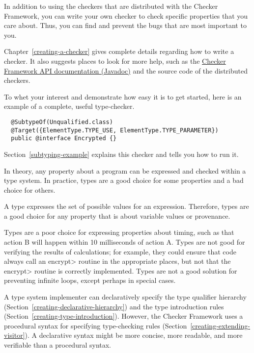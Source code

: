 

In addition to using the checkers that are distributed with the Checker
Framework, you can write your own checker to check specific properties that
you care about.  Thus, you can find and prevent the bugs that are most
important to you.

Chapter~\ref{creating-a-checker} gives
complete details regarding how to write a checker.  It also suggests places
to look for more help, such as the \href{../api/}{Checker Framework
API documentation (Javadoc)} and the source code of the distributed
checkers.

To whet your interest and demonstrate how easy it is to get started, here
is an example of a complete, useful type-checker.

\begin{Verbatim}
  @SubtypeOf(Unqualified.class)
  @Target({ElementType.TYPE_USE, ElementType.TYPE_PARAMETER})
  public @interface Encrypted {}
\end{Verbatim}

Section~\ref{subtyping-example} explains this checker and tells
you how to run it.



In theory, any property about a program can be expressed and checked within
a type system.  In practice, types are a good choice for some properties
and a bad choice for others.

A type expresses the set of possible values for an expression.  Therefore,
types are a good choice for any property that is about variable values or
provenance.

Types are a poor choice for expressing properties about timing, such as
that action B will happen within 10 milliseconds of action A.  Types are
not good for verifying the results of calculations; for example, they could
ensure that code always call an \<encrypt> routine in the appropriate
places, but not that the \<encrypt> routine is correctly implemented.
Types are not a good solution for preventing infinite loops, except perhaps
in special cases.



A type system implementer can declaratively specify the type qualifier
hierarchy (Section~\ref{creating-declarative-hierarchy}) and the type introduction rules
(Section~\ref{creating-type-introduction}).  However, the Checker
Framework uses a procedural syntax for specifying type-checking
rules (Section~\ref{creating-extending-visitor}).
A declarative syntax might be more concise, more readable, and more
verifiable than a procedural syntax.

